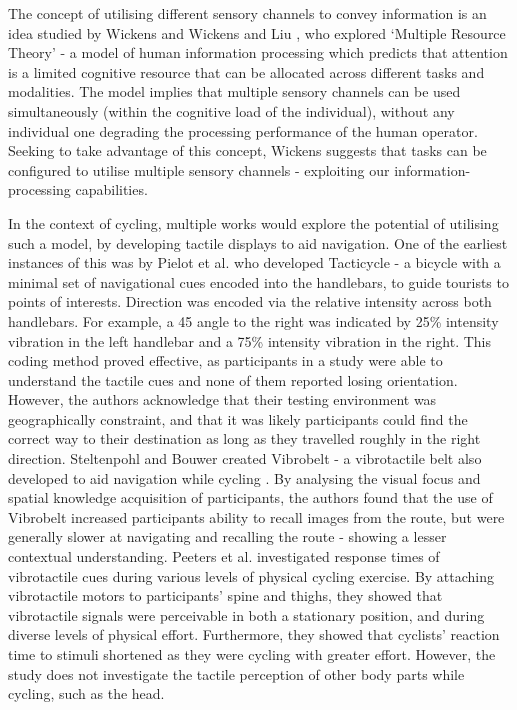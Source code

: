 \documentclass{mpaper}
\begin{document}
The concept of utilising different sensory channels to convey information is an idea studied by Wickens \cite{wickens1984processing} and Wickens and Liu \cite{doi:10.1177/001872088803000505}, who explored ‘Multiple Resource Theory’ - a model of human information processing which predicts that attention is a limited cognitive resource that can be allocated across different tasks and modalities. The model implies that multiple sensory channels can be used simultaneously (within the cognitive load of the individual), without any individual one degrading the processing performance of the human operator. Seeking to take advantage of this concept, Wickens suggests that tasks can be configured to utilise multiple sensory channels - exploiting our information-processing capabilities.

In the context of cycling, multiple works would explore the potential of utilising such a model, by developing tactile displays to aid navigation. One of the earliest instances of this was by Pielot et al. \cite{10.1145/2371574.2371631} who developed Tacticycle - a bicycle with a minimal set of navigational cues encoded into the handlebars, to guide tourists to points of interests. Direction was encoded via the relative intensity across both handlebars. For example, a 45\degree{} angle to the right was indicated by 25\% intensity vibration in the left handlebar and a 75\% intensity vibration in the right. This coding method proved effective, as participants in a study were able to understand the tactile cues and none of them reported losing orientation. However, the authors acknowledge that their testing environment was geographically constraint, and that it was likely participants could find the correct way to their destination as long as they travelled roughly in the right direction. Steltenpohl and Bouwer \cite{10.1145/2449396.2449450} created Vibrobelt - a vibrotactile belt also developed to aid navigation while cycling . By analysing the visual focus and spatial knowledge acquisition of participants, the authors found that the use of Vibrobelt increased participants ability to recall images from the route, but were generally slower at navigating and recalling the route - showing a lesser contextual understanding. Peeters et al. \cite{peeters2019vibrotactile} investigated response times of vibrotactile cues during various levels of physical cycling exercise. By attaching vibrotactile motors to participants' spine and thighs, they showed that vibrotactile signals were perceivable in both a stationary position, and during diverse levels of physical effort. Furthermore, they showed that cyclists' reaction time to stimuli shortened as they were cycling with greater effort. However, the study does not investigate the tactile perception of other body parts while cycling, such as the head.
\end{document}
